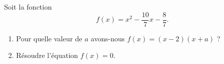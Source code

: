 
\begin{exercice}\label{exosmath-0320}

    Soit la fonction
    \begin{equation}
        f(x)=x^2-\frac{ 10 }{ 7 }x-\frac{ 8 }{ 7 }.
    \end{equation}
    \begin{enumerate}
        \item
            Pour quelle valeur de \( a\) avons-nous \( f(x)=(x-2)(x+a)\) ?
        \item
            Résoudre l'équation \( f(x)=0\).
    \end{enumerate}

\end{exercice}
